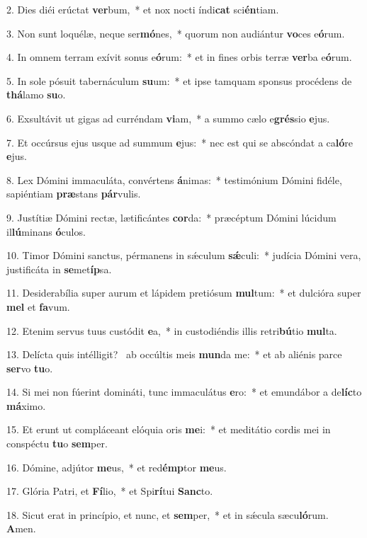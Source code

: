 2. Dies diéi erúctat \textbf{ver}bum,~*  et nox nocti índi\textbf{cat} sci\textbf{én}tiam.\

3. Non sunt loquélæ, neque ser\textbf{mó}nes,~*  quorum non audiántur \textbf{vo}ces e\textbf{ó}rum.\

4. In omnem terram exívit sonus e\textbf{ó}rum:~*  et in fines orbis terræ \textbf{ver}ba e\textbf{ó}rum.\

5. In sole pósuit tabernáculum \textbf{su}um:~*  et ipse tamquam sponsus procédens de \textbf{thá}lamo \textbf{su}o.\

6. Exsultávit ut gigas ad curréndam \textbf{vi}am,~*  a summo cælo e\textbf{grés}sio \textbf{e}jus.\

7. Et occúrsus ejus usque ad summum \textbf{e}jus:~*  nec est qui se abscóndat a ca\textbf{ló}re \textbf{e}jus.\

8. Lex Dómini immaculáta, convértens \textbf{á}nimas:~*  testimónium Dómini fidéle, sapiéntiam \textbf{præ}stans \textbf{pár}vulis.\

9. Justítiæ Dómini rectæ, lætificántes \textbf{cor}da:~*  præcéptum Dómini lúcidum il\textbf{lú}minans \textbf{ó}culos.\

10. Timor Dómini sanctus, pérmanens in sǽculum \textbf{sǽ}culi:~*  judícia Dómini vera, justificáta in \textbf{se}met\textbf{íp}sa.\

11. Desiderabília super aurum et lápidem pretiósum \textbf{mul}tum:~*  et dulcióra super \textbf{mel} et \textbf{fa}vum.\

12. Etenim servus tuus custódit \textbf{e}a,~*  in custodiéndis illis retri\textbf{bú}tio \textbf{mul}ta.\

13. Delícta quis intélligit? \dag\  ab occúltis meis \textbf{mun}da me:~*  et ab aliénis parce \textbf{ser}vo \textbf{tu}o.\

14. Si mei non fúerint domináti, tunc immaculátus \textbf{e}ro:~*  et emundábor a de\textbf{líc}to \textbf{má}ximo.\

15. Et erunt ut compláceant elóquia oris \textbf{me}i:~*  et meditátio cordis mei in conspéctu \textbf{tu}o \textbf{sem}per.\

16. Dómine, adjútor \textbf{me}us,~*  et red\textbf{émp}tor \textbf{me}us.\

17. Glória Patri, et \textbf{Fí}lio,~*  et Spi\textbf{rí}tui \textbf{Sanc}to.\

18. Sicut erat in princípio, et nunc, et \textbf{sem}per,~*  et in sǽcula sæcu\textbf{ló}rum. \textbf{A}men.\

